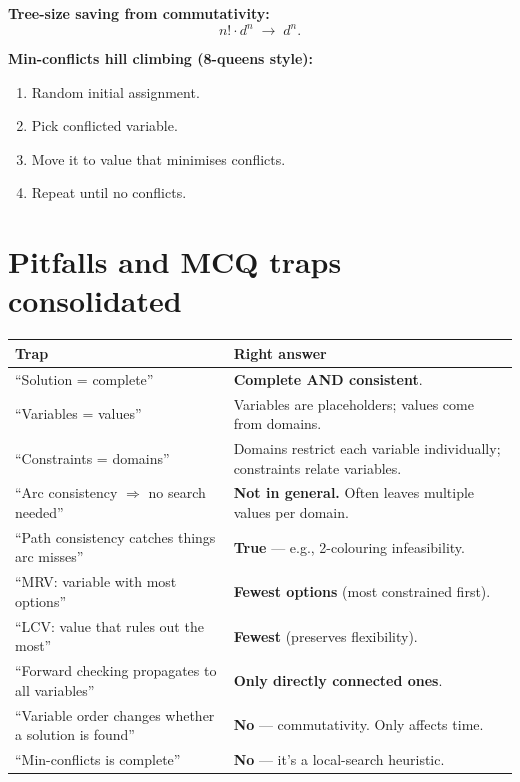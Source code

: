 \documentclass[11pt, a4paper]{article}
\newcommand{\thead}[1]{\textbf{#1}}
\begin{document}
\textbf{Tree-size saving from commutativity:}
\[
n! \cdot d^n \;\to\; d^n.
\]

\textbf{Min-conflicts hill climbing (8-queens style):}
\begin{enumerate}[itemsep=0pt, topsep=0pt]
  \item Random initial assignment.
  \item Pick conflicted variable.
  \item Move it to value that minimises conflicts.
  \item Repeat until no conflicts.
\end{enumerate}

\section*{Pitfalls and MCQ traps consolidated}

\begin{trapbox}[summary]
\begin{tabular}{@{}p{6.5cm}p{8cm}@{}}
\toprule
\thead{Trap} & \thead{Right answer} \\
\midrule
``Solution = complete''                   & \textbf{Complete AND consistent}. \\
``Variables = values''                    & Variables are placeholders; values come from domains. \\
``Constraints = domains''                 & Domains restrict each variable individually; constraints relate variables. \\
``Arc consistency $\Rightarrow$ no search needed'' & \textbf{Not in general.} Often leaves multiple values per domain. \\
``Path consistency catches things arc misses''     & \textbf{True} — e.g., 2-colouring infeasibility. \\
``MRV: variable with most options''       & \textbf{Fewest options} (most constrained first). \\
``LCV: value that rules out the most''    & \textbf{Fewest} (preserves flexibility). \\
``Forward checking propagates to all variables'' & \textbf{Only directly connected ones}. \\
``Variable order changes whether a solution is found'' & \textbf{No} — commutativity. Only affects time. \\
``Min-conflicts is complete''             & \textbf{No} — it's a local-search heuristic. \\
\bottomrule
\end{tabular}
\end{trapbox}
\end{document}
